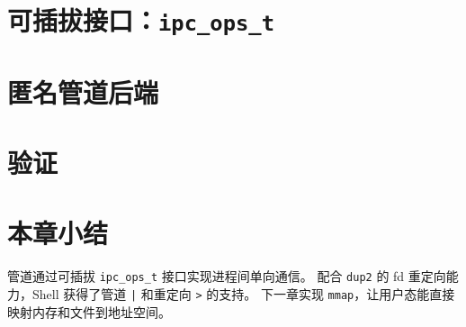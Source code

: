 \section{可插拔接口：\texttt{ipc\_ops\_t}}
\label{sec:pipe-interface}


\section{匿名管道后端}
\label{sec:pipe-impl}


\section{验证}
\label{sec:pipe-verify}


\section{本章小结}

管道通过可插拔 \texttt{ipc\_ops\_t} 接口实现进程间单向通信。
配合 \texttt{dup2} 的 fd 重定向能力，Shell 获得了管道 \texttt{|} 和重定向 \texttt{>} 的支持。
下一章实现 \texttt{mmap}，让用户态能直接映射内存和文件到地址空间。
